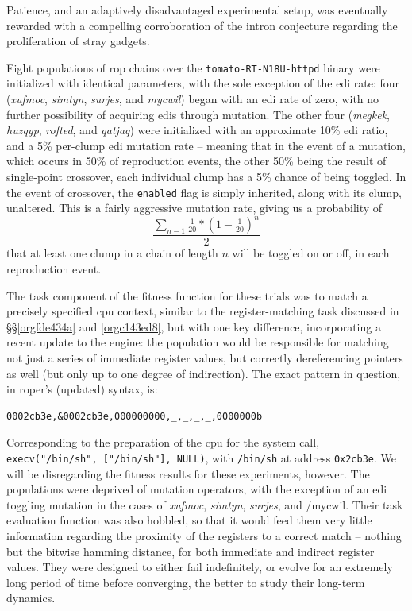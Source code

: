 \documentclass[12pt,glossary]{dalthesis}
\begin{document}
Patience, and an adaptively disadvantaged experimental setup, was eventually
rewarded with a compelling corroboration of the intron conjecture regarding
the proliferation of stray gadgets. 

Eight populations of \gls{rop} chains over the \texttt{tomato-RT-N18U-httpd} binary were
initialized with identical parameters, with the sole exception of the \gls{edi}
rate: four (\emph{xufmoc}, \emph{simtyn}, \emph{surjes}, and \emph{mycwil}) began with an \gls{edi}
rate of zero, with no further possibility of acquiring \glspl{edi} through
mutation. The other four (\emph{megkek}, \emph{huzqyp}, \emph{rofted}, and \emph{qatjaq}) were
initialized with an approximate 10\% \gls{edi} ratio, and a 5\% per-clump \gls{edi}
mutation rate -- meaning that in the event of a mutation, which occurs in 50\% of
reproduction events, the other 50\% being the result of single-point crossover,
each individual clump has a 5\% chance of being toggled. In the event of
crossover, the \texttt{enabled} flag is simply inherited, along with its clump,
unaltered. This is a fairly aggressive mutation rate, giving us a probability of
$$ \frac{\sum_{n-1} \frac{1}{20} * (1 - \frac{1}{20})^n}{2} $$ that at least one
clump in a chain of length \(n\) will be toggled on or off, in each reproduction
event.

The task component of the fitness function for these trials was to match a
precisely specified \gls{cpu} context, similar to the register-matching task
discussed in \S\S \ref{orgfde434a} and \ref{orgc143ed8}, but
with one key difference, incorporating a recent update to the engine: the
population would be responsible for matching not just a series of immediate
register values, but correctly dereferencing pointers as well (but only up to
one degree of indirection). The exact
pattern in question, in \gls{roper}'s (updated) syntax, is:
\begin{verbatim}
0002cb3e,&0002cb3e,000000000,_,_,_,_,0000000b
\end{verbatim}
Corresponding to the preparation of the \gls{cpu} for the system call,
\texttt{execv("/bin/sh", ["/bin/sh"], NULL)}, with \texttt{/bin/sh} at address
\texttt{0x2cb3e}. We will be disregarding the fitness results for these experiments,
however. The populations were deprived of mutation operators, with the exception
of an \gls{edi} toggling mutation in the cases of \emph{xufmoc}, \emph{simtyn}, \emph{surjes}, and
/mycwil. Their task evaluation function was also hobbled, so that it would feed
them very little information regarding the proximity of the registers to a correct match -- nothing but the bitwise hamming distance, for both immediate and indirect register
values. They were designed to either fail indefinitely, or evolve for an extremely
long period of time before converging, the better to study their long-term
dynamics. 
\end{document}
